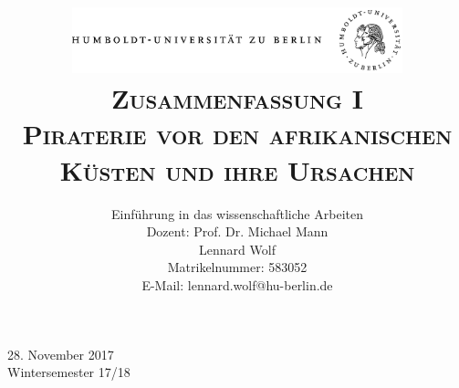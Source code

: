 \documentclass[a4paper, 12pt]{article}
\date{\vspace{-3ex}}
\begin{document}
\title{\vspace{5ex}
	\includegraphics*[bb=0 0 720 200, width=0.72\textwidth]{ErstesSem/images/hu_logo.png}\\
	\vspace{30pt}
	\scshape\LARGE{Zusammenfassung I}\\\Large{Piraterie vor den afrikanischen\\Küsten und ihre Ursachen}\\\vspace{20pt}}
	


\author{Einführung in das wissenschaftliche Arbeiten\\
	\vspace{7pt}
          Dozent: Prof. Dr. Michael Mann\\\vspace{4pt}Lennard Wolf\\
        \small{Matrikelnummer: 583052}\\
        \small{E-Mail: lennard.wolf@hu-berlin.de}}


\maketitle

\vspace{\fill}

\begin{minipage}[]{0.92\textwidth}
    \centering
    \onehalfspacing
    \large   
    28. November 2017\\
    Wintersemester 17/18

    \vspace{-20mm} 
\end{minipage}%
\thispagestyle{empty}
\newpage
\null
\thispagestyle{empty}
\newpage
\setcounter{page}{1}
\end{document}
